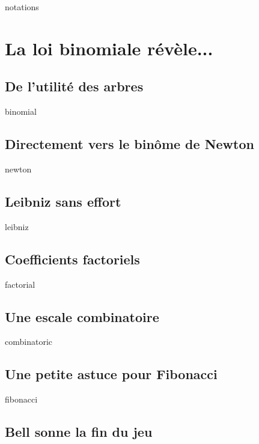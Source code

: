 \documentclass[12pt]{amsart}
\begin{document}
{notations}




\section{La loi binomiale révèle...} \label{bino-implies}

    \subsection{De l'utilité des arbres} \label{useful-trees}
    
    {binomial}
    
    
    \subsection{Directement vers le binôme de Newton}
    
    {newton}
    
    
    \subsection{Leibniz sans effort}
    
    {leibniz}
    
    
    \subsection{Coefficients factoriels} \label{tree-facto}
    
    {factorial}
    
    
    \subsection{Une escale combinatoire}
    
    {combinatoric}
    
    
    \subsection{Une petite astuce pour Fibonacci}
    
    {fibonacci}
    
    
    \subsection{Bell sonne la fin du jeu} \label{tree-bell}
    
\end{document}
